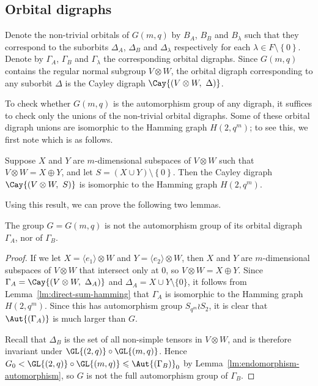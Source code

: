 \subsection{Orbital digraphs}

Denote the non-trivial orbitals of $G{\left(m, q \right)}$ by $B_A$, $B_B$ and $B_\lambda$ such that they correspond to the suborbits $\Delta_A$, $\Delta_B$ and $\Delta_\lambda$ respectively for each $\lambda \in F \setminus \left\{0 \right\}$. Denote by $\Gamma_A$, $\Gamma_B$ and $\Gamma_\lambda$ the corresponding orbital digraphs. Since $G{\left(m, q \right)}$ contains the regular normal subgroup $V \otimes W$, the orbital digraph corresponding to any suborbit $\Delta$ is the Cayley digraph $\Cay{\left(V \otimes W,\ \Delta \right)}$.

To check whether $G{\left(m, q \right)}$ is the automorphism group of any digraph, it suffices to check only the unions of the non-trivial orbital digraphs. Some of these orbital digraph unions are isomorphic to the Hamming graph $H{\left(2, q^m \right)}$; to see this, we first note \cite[Lemma 3.1]{ref:giudici-primitive} which is as follows.

\begin{lemma} \label{lm:direct-sum-hamming}
Suppose $X$ and $Y$ are $m$-dimensional subspaces of $V \otimes W$ such that $V \otimes W = X \oplus Y$, and let $S = \left(X \cup Y \right) \setminus \left\{0 \right\}$. Then the Cayley digraph $\Cay{\left(V \otimes W,\ S \right)}$ is isomorphic to the Hamming graph $H{\left(2, q^m \right)}$.
\end{lemma}

Using this result, we can prove the following two lemmas.

\begin{lemma} \label{lm:Gamma_A,B}
The group $G = G{\left(m, q \right)}$ is not the automorphism group of its orbital digraph $\Gamma_A$, nor of $\Gamma_B$.
\end{lemma}
\begin{proof}
If we let $X = \langle e_1 \rangle \otimes W$ and $Y = \langle e_2 \rangle \otimes W$, then $X$ and $Y$ are $m$-dimensional subspaces of $V \otimes W$ that intersect only at $0$, so $V \otimes W = X \oplus Y$. Since $\Gamma_A = \Cay{\left(V \otimes W,\ \Delta_A \right)}$ and $\Delta_A = X \cup Y \setminus \{0\}$, it follows from Lemma~\ref{lm:direct-sum-hamming} that $\Gamma_A$ is isomorphic to the Hamming graph $H{\left(2, q^m \right)}$. Since this has automorphism group $S_{q^m} \wr S_2$, it is clear that $\Aut{\left(\Gamma_A \right)}$ is much larger than $G$.

Recall that $\Delta_B$ is the set of all non-simple tensors in $V \otimes W$, and is therefore invariant under $\GL{\left(2, q \right)} \circ \GL{\left(m, q \right)}$. Hence $G_0 < \GL{\left(2, q \right)} \circ \GL{\left(m, q \right)} \leqslant \Aut{\left(\Gamma_B \right)}_0$ by Lemma~\ref{lm:endomorphism-automorphism}, so $G$ is not the full automorphism group of $\Gamma_B$.
\end{proof}

